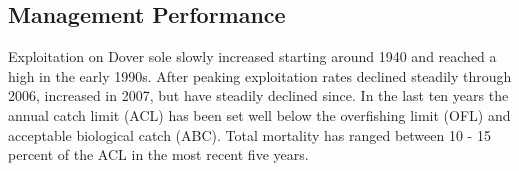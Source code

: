 \documentclass[11pt,
  english,
  a4paper,
]{article}
\begin{document}
\leavevmode\tagmcend\tagstructend\par



\clearpage


\hypertarget{management-performance}{%
\subsection*{Management Performance}\label{management-performance}}

\leavevmode\tagmcend\tagstructend


Exploitation on Dover sole slowly increased starting around 1940 and reached a high in the early 1990s. After peaking exploitation rates declined steadily through 2006, increased in 2007, but have steadily declined since. In the last ten years the annual catch limit (ACL) has been set well below the overfishing limit (OFL) and acceptable biological catch (ABC). Total mortality has ranged between 10 - 15 percent of the ACL in the most recent five years.

\leavevmode\tagmcend\tagstructend\par

\begingroup\fontsize{10}{12}\selectfont
\begingroup\fontsize{10}{12}\selectfont
\end{document}
